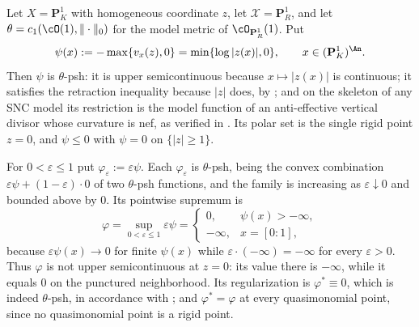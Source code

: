 \begin{example}
\label{ex:ch23-sup-not-usc}
Let \(X=\mathbf P^1_K\) with homogeneous coordinate \(z\), let
\(\mathcal X=\mathbf P^1_R\), and let \(\theta=c_1(\cO(1),\|\cdot\|_0)\) for
the model metric of \(\cO_{\mathbf P^1_R}(1)\).  Put
\begin{equation}\label{eq:ch23-log-pole-potential}
 \psi(x):=-\max\{v_x(z),0\}
 =\min\{\log|z(x)|,0\},
 \qquad x\in(\mathbf P^1_K)^{\An}.
\end{equation}
Then \(\psi\) is \(\theta\)-psh: it is upper semicontinuous because
\(x\mapsto|z(x)|\) is continuous; it satisfies the retraction inequality
because \(|z|\) does, by ; and on the skeleton
of any SNC model its restriction is the model function of an anti-effective
vertical divisor whose curvature is nef, as verified in
.  Its polar set is the single rigid point
\(z=0\), and \(\psi\leq0\) with \(\psi=0\) on \(\{|z|\geq1\}\).

For \(0<\varepsilon\leq1\) put \(\varphi_\varepsilon:=\varepsilon\psi\).
Each \(\varphi_\varepsilon\) is \(\theta\)-psh, being the convex combination
\(\varepsilon\psi+(1-\varepsilon)\cdot0\) of two \(\theta\)-psh functions,
and the family is increasing as \(\varepsilon\downarrow0\) and bounded above
by \(0\).  Its pointwise supremum is
\[
 \varphi=\sup_{0<\varepsilon\leq1}\varepsilon\psi
 =\begin{cases}
   0,&\psi(x)>-\infty,\\
   -\infty,&x=[0:1],
 \end{cases}
\]
because \(\varepsilon\psi(x)\to0\) for finite \(\psi(x)\) while
\(\varepsilon\cdot(-\infty)=-\infty\) for every \(\varepsilon>0\).  Thus
\(\varphi\) is not upper semicontinuous at \(z=0\): its value there is
\(-\infty\), while it equals \(0\) on the punctured neighborhood.  Its
regularization is \(\varphi^*\equiv0\), which is indeed \(\theta\)-psh, in
accordance with ; and \(\varphi^*=\varphi\) at
every quasimonomial point, since no quasimonomial point is a rigid point.
\end{example}

